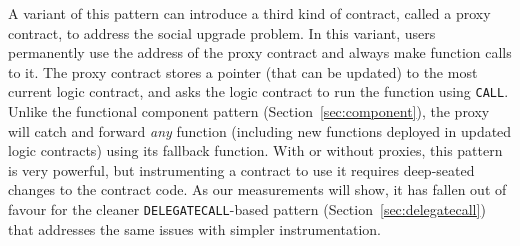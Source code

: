 A variant of this pattern can introduce a third kind of contract, called a proxy contract, to address the social upgrade problem. In this variant, users permanently use the address of the proxy contract and always make function calls to it. The proxy contract stores a pointer (that can be updated) to the most current logic contract, and asks the logic contract to run the function using \texttt{CALL}. Unlike the functional component pattern (Section~\ref{sec:component}), the proxy will catch and forward \textit{any} function (including new functions deployed in updated logic contracts) using its fallback function.  With or without proxies, this pattern is very powerful, but instrumenting a contract to use it requires deep-seated changes to the contract code. As our measurements will show, it has fallen out of favour for the cleaner \texttt{DELEGATECALL}-based pattern (Section~\ref{sec:delegatecall}) that addresses the same issues with simpler instrumentation. 




